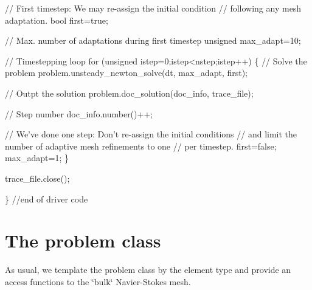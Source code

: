 \begin{DoxyCodeInclude}


 \textcolor{comment}{// First timestep: We may re-assign the initial condition}
 \textcolor{comment}{// following any mesh adaptation.}
 \textcolor{keywordtype}{bool} first=\textcolor{keyword}{true};

 \textcolor{comment}{// Max. number of adaptations during first timestep}
 \textcolor{keywordtype}{unsigned} max\_adapt=10;

 \textcolor{comment}{// Timestepping loop}
 \textcolor{keywordflow}{for} (\textcolor{keywordtype}{unsigned} istep=0;istep<nstep;istep++)
  \{
   \textcolor{comment}{// Solve the problem}
   problem.unsteady\_newton\_solve(dt, max\_adapt, first);
    

   \textcolor{comment}{// Outpt the solution}
   problem.doc\_solution(doc\_info, trace\_file);
   
   \textcolor{comment}{// Step number}
   doc\_info.number()++;

   \textcolor{comment}{// We've done one step: Don't re-assign the initial conditions}
   \textcolor{comment}{// and limit the number of adaptive mesh refinements to one}
   \textcolor{comment}{// per timestep.}
   first=\textcolor{keyword}{false};
   max\_adapt=1;
  \}

 trace\_file.close();
 
\} \textcolor{comment}{//end of driver code}

\end{DoxyCodeInclude}




 

\hypertarget{index_problemclass}{}\section{The problem class}\label{index_problemclass}
As usual, we template the problem class by the element type and provide an access functions to the \char`\"{}bulk\char`\"{} Navier-\/\+Stokes mesh.

